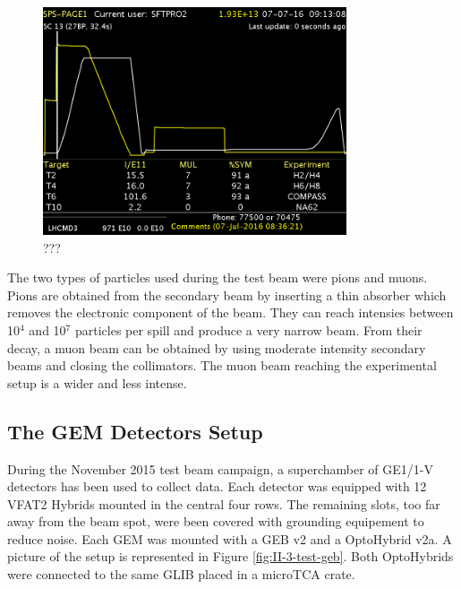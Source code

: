     \begin{figure}[h!]
      \centering
      \includegraphics[width=0.8\textwidth]{img/II-3-test-beam/sps.png}
      \caption{???}
      \label{fig:II-3-sps}
    \end{figure}

    The two types of particles used during the test beam were pions and muons. Pions are obtained from the secondary beam by inserting a thin absorber which removes the electronic component of the beam. They can reach intensies between 10$^4$ and 10$^7$ particles per spill and produce a very narrow beam. From their decay, a muon beam can be obtained by using moderate intensity secondary beams and closing the collimators. The muon beam reaching the experimental setup is a wider and less intense.

    \subsection{The GEM Detectors Setup}

      During the November 2015 test beam campaign, a superchamber of GE1/1-V detectors has been used to collect data. Each detector was equipped with 12 VFAT2 Hybrids mounted in the central four rows. The remaining slots, too far away from the beam spot, were been covered with grounding equipement to reduce noise. Each GEM was mounted with a GEB v2 and a OptoHybrid v2a. A picture of the setup is represented in Figure \ref{fig:II-3-test-geb}. Both OptoHybrids were connected to the same GLIB placed in a microTCA crate. \\

